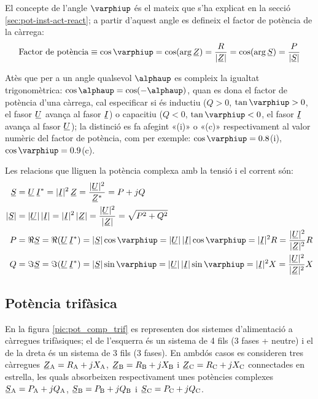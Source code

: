 El concepte de l'angle $\varphiup$ és el mateix que s'ha explicat en la secció \ref{sec:pot-inst-act-react}; a partir d'aquest angle es
defineix el factor de potència de la càrrega:
\begin{equation}
   \text{Factor de potència} \equiv \cos\varphiup = \cos (\arg \cmplx{Z}) = 
   \frac{R}{|\cmplx{Z}|} =
   \cos (\arg \cmplx{S}) =
   \frac{P}{|\cmplx{S}|}
\end{equation}

Atès que per a un angle qualsevol $\alphaup$ es compleix la igualtat
trigonomètrica: $\cos\alphaup = \cos(-\alphaup)$, quan es dona el factor
de potència d'una càrrega, cal especificar si és inductiu ($Q>0$,
$\tan\varphiup>0$, el fasor $\cmplx{U}$ avança al fasor $\cmplx{I}$) o
capacitiu ($Q<0$, $\tan\varphiup<0$, el fasor $\cmplx{I}$ avança al fasor $\cmplx{U}$); la distinció es fa
afegint «(i)» o «(c)» respectivament al valor numèric del factor
de potència, com per exemple: $\cos\varphiup=\num{0,8}$(i),
$\cos\varphiup=\num{0,9}$(c).

Les relacions que lliguen la potència complexa amb la tensió i el corrent són:
\begin{align}
   \cmplx{S} &=  \cmplx{U} \,\cmplx{I}^* =
   |\cmplx{I}|^2 \,\cmplx{Z} = \frac{|\cmplx{U}|^2}{\cmplx{Z}^*} =
   P + j Q \label{eq:s_mono1}\\
   |\cmplx{S}| &= |\cmplx{U}| \,|\cmplx{I}| =
   |\cmplx{I}|^2 \,|\cmplx{Z}| = \frac{|\cmplx{U}|^2}{|\cmplx{Z}|} =
   \sqrt{P^2+Q^2} \\
   P &= \Re\cmplx{S} = \Re (\cmplx{U} \, \cmplx{I}^*) = |\cmplx{S}| \cos\varphiup =
   |\cmplx{U}|\, |\cmplx{I}| \cos\varphiup = |\cmplx{I}|^2 R =
   \frac{|\cmplx{U}|^2}{|\cmplx{Z}|^2}R\\
   Q &= \Im\cmplx{S} = \Im (\cmplx{U} \, \cmplx{I}^*) = |\cmplx{S}| \sin\varphiup =
   |\cmplx{U}| \,|\cmplx{I}|\sin\varphiup  = |\cmplx{I}|^2 X =
   \frac{|\cmplx{U}|^2}{|\cmplx{Z}|^2}X
\end{align}

\subsection{Potència trifàsica}  \label{sec:pot-trif}

En la figura \vref{pic:pot_comp_trif} es representen dos sistemes
d'alimentació a càrregues trifàsiques; el de l'esquerra és un
sistema de 4 fils (3 fases + neutre) i el de la dreta és un sistema
de 3 fils (3 fases). En ambdós casos es consideren tres càrregues
$\cmplx{Z}\ped{A} = R\ped{A} + j X\ped{A}$, $\cmplx{Z}\ped{B}=
R\ped{B} + j X\ped{B}$ i $\cmplx{Z}\ped{C}= R\ped{C} + j X\ped{C}$
connectades en estrella, les quals absorbeixen respectivament unes
potències complexes $\cmplx{S}\ped{A} = P\ped{A} + j Q\ped{A}$,
$\cmplx{S}\ped{B}= P\ped{B} + j Q\ped{B}$ i $\cmplx{S}\ped{C}=
P\ped{C} + j Q\ped{C}$.

